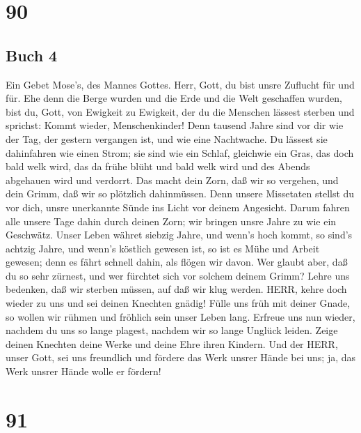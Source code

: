 \hypertarget{section-89}{%
\section{90}\label{section-89}}

\hypertarget{buch-4}{%
\subsection{Buch 4}\label{buch-4}}

 Ein Gebet Mose's, des Mannes Gottes. Herr, Gott, du bist
unsre Zuflucht für und für.  Ehe denn die Berge wurden und
die Erde und die Welt geschaffen wurden, bist du, Gott, von Ewigkeit zu
Ewigkeit,  der du die Menschen lässest sterben und sprichst:
Kommt wieder, Menschenkinder!  Denn tausend Jahre sind vor
dir wie der Tag, der gestern vergangen ist, und wie eine Nachtwache.
 Du lässest sie dahinfahren wie einen Strom; sie sind wie
ein Schlaf, gleichwie ein Gras, das doch bald welk wird, 
das da frühe blüht und bald welk wird und des Abends abgehauen wird und
verdorrt.  Das macht dein Zorn, daß wir so vergehen, und
dein Grimm, daß wir so plötzlich dahinmüssen.  Denn unsere
Missetaten stellst du vor dich, unsre unerkannte Sünde ins Licht vor
deinem Angesicht.  Darum fahren alle unsere Tage dahin durch
deinen Zorn; wir bringen unsre Jahre zu wie ein Geschwätz. 
Unser Leben währet siebzig Jahre, und wenn's hoch kommt, so sind's
achtzig Jahre, und wenn's köstlich gewesen ist, so ist es Mühe und
Arbeit gewesen; denn es fährt schnell dahin, als flögen wir davon.
 Wer glaubt aber, daß du so sehr zürnest, und wer fürchtet
sich vor solchem deinem Grimm?  Lehre uns bedenken, daß wir
sterben müssen, auf daß wir klug werden.  HERR, kehre doch
wieder zu uns und sei deinen Knechten gnädig!  Fülle uns
früh mit deiner Gnade, so wollen wir rühmen und fröhlich sein unser
Leben lang.  Erfreue uns nun wieder, nachdem du uns so
lange plagest, nachdem wir so lange Unglück leiden.  Zeige
deinen Knechten deine Werke und deine Ehre ihren Kindern. 
Und der HERR, unser Gott, sei uns freundlich und fördere das Werk unsrer
Hände bei uns; ja, das Werk unsrer Hände wolle er fördern!

\hypertarget{section-90}{%
\section{91}\label{section-90}}

